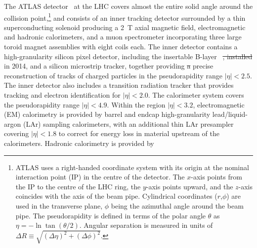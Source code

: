 \documentclass[PAPER, coverpage, atlasdraft=true, texlive=2016, UKenglish]{\ATLASLATEXPATH atlasdoc}
\providecommand{\DIFadd}[1]{{\protect\color{blue}\uwave{#1}}} %
\providecommand{\DIFdel}[1]{{\protect\color{red}\sout{#1}}}                      %
\providecommand{\DIFaddbegin}{} %
\providecommand{\DIFaddend}{} %
\providecommand{\DIFdelbegin}{} %
\providecommand{\DIFdelend}{} %
\begin{document}
The ATLAS detector~\cite{PERF-2007-01} at the LHC covers almost the entire solid angle around the collision point,\footnote{ATLAS 
uses a right-handed coordinate system with its origin at the nominal interaction point (IP) in the 
centre of the detector.  
The $x$-axis points from
the IP to the centre of the LHC ring, %
the $y$-axis points upward,
and the $z$-axis coincides with the axis of the beam pipe.
Cylindrical coordinates ($r$,$\phi$) are used 
in the transverse plane, $\phi$ being the azimuthal angle around the beam pipe. The pseudorapidity is defined in 
terms of the polar angle $\theta$ as $\eta = - \ln \tan(\theta/2)$.
Angular separation is measured in units of $\Delta R\equiv \sqrt{(\Delta\eta)^2+(\Delta\phi)^2}$.} and \DIFaddbegin \DIFadd{it }\DIFaddend consists of an inner tracking detector surrounded by a thin superconducting solenoid producing a
2~T axial magnetic field, electromagnetic and hadronic calorimeters, and a muon spectrometer incorporating three large toroid magnet assemblies with eight coils each. The inner detector contains a high-granularity silicon pixel detector, including the %
insertable B-layer~\cite{IBL1,IBL2,Abbott:2018ikt} \DIFdelbegin \DIFdel{, installed }\DIFdelend \DIFaddbegin \DIFadd{added as a new innermost layer }\DIFaddend in 2014, and a silicon microstrip tracker, together providing \DIFdelbegin \DIFdel{a }\DIFdelend precise reconstruction of tracks of charged particles in the pseudorapidity range $|\eta|<2.5$.
The inner detector also includes a transition radiation tracker that provides tracking and electron identification for $|\eta|<2.0$.
The calorimeter system covers the pseudorapidity range $|\eta| < 4.9$. Within the region $|\eta|< 3.2$, electromagnetic (EM) calorimetry is provided by barrel and endcap high-granularity lead/liquid-argon (LAr) sampling calorimeters, with an additional thin LAr presampler covering $|\eta| < 1.8$ to correct for energy loss in material upstream of the calorimeters. Hadronic calorimetry is provided by %
\end{document}

